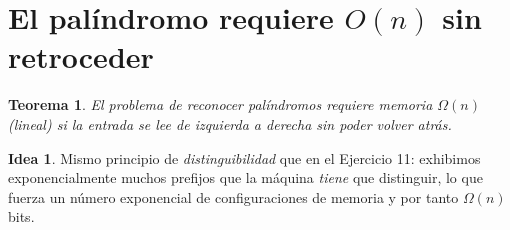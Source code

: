 \documentclass[11pt,a4paper]{article}
\theoremstyle{plain}
\newtheorem{teorema}{Teorema}
\theoremstyle{definition}
\newtheorem*{idea}{Idea}
\begin{document}
\section{El pal\'indromo requiere $O(n)$ sin retroceder}

\begin{teorema}
El problema de reconocer pal\'indromos requiere memoria $\Omega(n)$ (lineal) si la
entrada se lee de izquierda a derecha sin poder volver atr\'as.
\end{teorema}

\begin{idea}
Mismo principio de \emph{distinguibilidad} que en el Ejercicio 11: exhibimos
exponencialmente muchos prefijos que la m\'aquina \emph{tiene} que distinguir, lo que
fuerza un n\'umero exponencial de configuraciones de memoria y por tanto
$\Omega(n)$ bits.
\end{idea}
\end{document}
